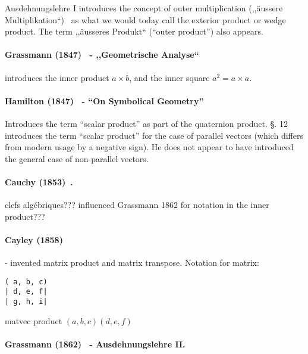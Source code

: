 Ausdehnungslehre I introduces the concept of outer multiplication (,,äussere Multiplikation``)~\cite[\S 34, p.57]{Grassmann1844}\cite[p. 81]{Grassmann1995} as what we would today call the exterior product or wedge product. The term ,,äusseres Produkt``\cite[\S 36, p. 60]{Grassmann1844} (``outer product''\cite[p. 84]{Grassmann1995}) also appears.

\paragraph{Grassmann (1847)~\cite{Grassmann1847,Grassmann1995} - ,,Geometrische Analyse``}

\cite[\S 7, p. 334]{Grassmann1995} introduces the inner product $a \times b$, and the inner square $a^2 = a \times a$.

\paragraph{Hamilton (1847)~\cite{Hamilton1847} - ``On Symbolical Geometry''}

Introduces the term ``scalar product'' as part of the quaternion product. \S. 12 introduces the term ``scalar product'' for the case of parallel vectors (which differs from modern usage by a negative sign). He does not appear to have introduced the general case of non-parallel vectors.

\paragraph{Cauchy (1853)~\cite{Cauchy1853}.} clefs algébriques??? influenced Grassmann 1862 for notation in the inner product???

\paragraph{Cayley (1858)~\cite{Cayley1858}} - invented matrix product and matrix transpose.
Notation for matrix:
\begin{verbatim}
( a, b, c)
| d, e, f|
| g, h, i|
\end{verbatim}

matvec product $(a, b, c)\!\!(d, e, f)$


\paragraph{Grassmann (1862)~\cite{Grassmann1862,Grassmann2000} - Ausdehnungslehre II.}

